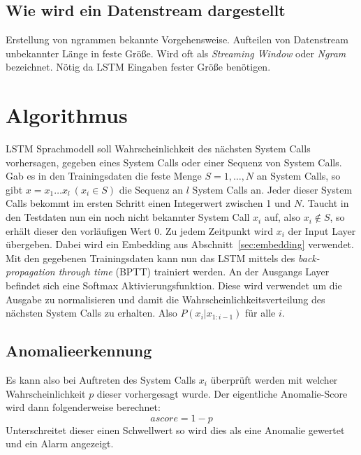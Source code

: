         \subsection{Wie wird ein Datenstream dargestellt}\label{sec:streamdarstellung}
            Erstellung von ngrammen bekannte Vorgehensweise.
            Aufteilen von Datenstream unbekannter Länge in feste Größe.
            Wird oft als \textit{Streaming Window} oder \textit{Ngram} bezeichnet.
            Nötig da LSTM Eingaben fester Größe benötigen.


    \section{Algorithmus}\label{sec:Algorithmus}
        LSTM Sprachmodell soll Wahrscheinlichkeit des nächsten System Calls vorhersagen, gegeben eines System Calls oder einer Sequenz von System Calls.
        Gab es in den Trainingsdaten die feste Menge $S = {1,\dots,N}$ an System Calls, so gibt $x=x_1\dots x_l \ (x_i\in S)$ die Sequenz an $l$ System Calls an.
        Jeder dieser System Calls bekommt im ersten Schritt einen Integerwert zwischen 1 und $N$.
        Taucht in den Testdaten nun ein noch nicht bekannter System Call $x_i$ auf, also $x_i \notin S$, so erhält dieser den vorläufigen Wert 0.
        Zu jedem Zeitpunkt wird $x_i$ der Input Layer übergeben.
        Dabei wird ein Embedding aus Abschnitt~\ref{sec:embedding} verwendet. 
        Mit den gegebenen Trainingsdaten kann nun das LSTM mittels des \textit{back-propagation through time} (BPTT) trainiert werden.
        An der Ausgangs Layer befindet sich eine Softmax Aktivierungsfunktion.
        Diese wird verwendet um die Ausgabe zu normalisieren und damit die Wahrscheinlichkeitsverteilung des nächsten System Calls zu erhalten.
        Also $P\left(x_i|x_{1:i-1}\right)$ für alle $i$. 
        
        \subsection{Anomalieerkennung}\label{sec:Anomalieerkennung}
            Es kann also bei Auftreten des System Calls $x_i$ überprüft werden mit welcher Wahrscheinlichkeit $p$ dieser vorhergesagt wurde.
            Der eigentliche Anomalie-Score wird dann folgenderweise berechnet:
            \begin{equation}
                ascore = 1 - p
            \end{equation}
            Unterschreitet dieser einen Schwellwert so wird dies als eine Anomalie gewertet und ein Alarm angezeigt.
